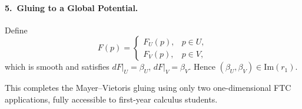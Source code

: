 \documentclass[11pt]{article}
\begin{document}
	\paragraph{5.~Gluing to a Global Potential.}
	Define
	\[
	F(p)=\begin{cases}F_U(p),&p\in U,\\F_V(p),&p\in V,\end{cases}
	\]
	which is smooth and satisfies $dF|_U=\beta_U$, $dF|_V=\beta_V$.  Hence $(\beta_U,\beta_V)\in\mathrm{Im}(r_1)$.
	
	This completes the Mayer--Vietoris gluing using only two one-dimensional FTC applications, fully accessible to first-year calculus students.
	
\end{document}

